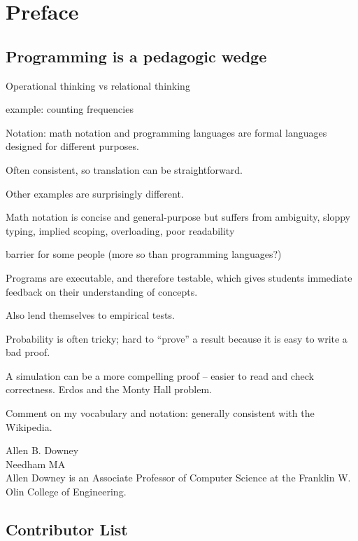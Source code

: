 \documentclass[12pt]{book}
\begin{document}
\chapter{Preface}
\label{preface}

\section*{Programming is a pedagogic wedge}

Operational thinking vs relational thinking

example: counting frequencies

Notation: math notation and programming languages are formal languages
designed for different purposes.

Often consistent, so translation can be straightforward.

Other examples are surprisingly different.

Math notation is concise and general-purpose but suffers from
ambiguity, sloppy typing, implied scoping, overloading, poor
readability

barrier for some people (more so than programming languages?)

Programs are executable, and therefore testable, which gives students
immediate feedback on their understanding of concepts.

Also lend themselves to empirical tests.

Probability is often tricky; hard to ``prove'' a result because it
is easy to write a bad proof.

A simulation can be a more compelling proof -- easier to read and check
correctness.  Erdos and the Monty Hall problem.

Comment on my vocabulary and notation: generally consistent with the
Wikipedia.


Allen B. Downey \\
Needham MA\\

Allen Downey is an Associate Professor of Computer Science at 
the Franklin W. Olin College of Engineering.







\section*{Contributor List}
\end{document}
